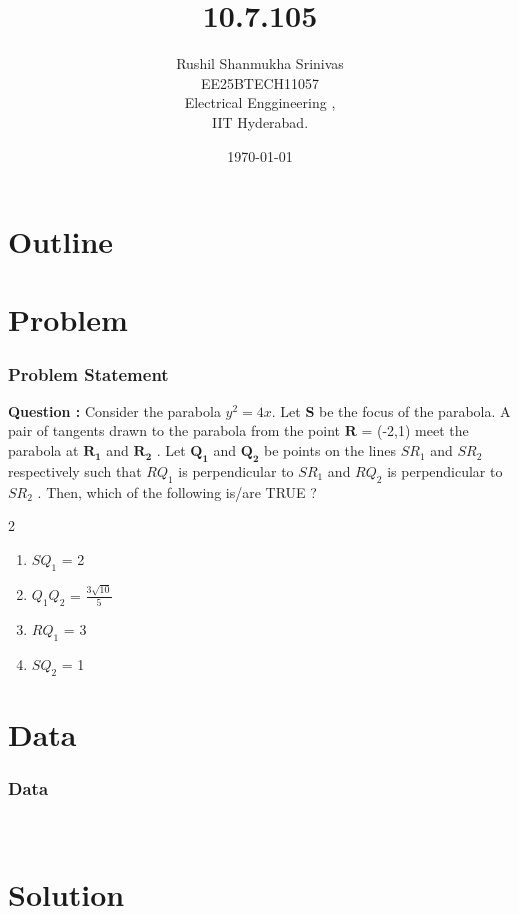 \documentclass{beamer}
\title{10.7.105}
\author{Rushil Shanmukha Srinivas \\EE25BTECH11057 \\ Electrical Enggineering ,\\IIT Hyderabad.}
\date{\today}
\theoremstyle{remark}
\let\vec\mathbf
\numberwithin{equation}{section}
\numberwithin{equation}{section}
\begin{document}
 

\begin{frame}
\titlepage
\end{frame}

\section*{Outline}
\begin{frame}
\tableofcontents
\end{frame}
\section{Problem}
\begin{frame}
\frametitle{Problem Statement}
\textbf{Question :}  
Consider the parabola $y^2 = 4x$. Let $\vec{S}$ be the focus of the parabola. A pair of tangents
drawn to the parabola from the point $\vec{R}$ = (-2,1) meet the parabola at $\vec{R_1}$ and $\vec{R_2}$ .
Let $\vec{Q_1}$ and $\vec{Q_2}$ be points on the lines $S{R_1}$ and $S{R_2}$ respectively such that $RQ_1$ is
perpendicular to $SR_1$ and $RQ_2$ is perpendicular to $SR_2$ . Then, which of the following
is/are TRUE ?
\begin{multicols}{2}
\begin{enumerate}
\item $SQ_1$ = 2
\item $Q_1Q_2$ = $\frac{3\sqrt{10}}{5}$
\item $RQ_1$ = 3
\item $SQ_2$ = 1
\end{enumerate}
\end{multicols}
\end{frame}
\section{Data}
\begin{frame}
\frametitle{Data}
\\ \begin{table}[h!]    
  \centering
  
  \caption{Conic representation}
\end{table}
\end{frame}
\section{Solution}
\end{document}
